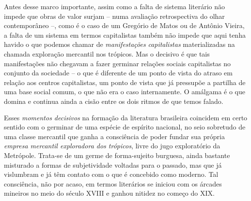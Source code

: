 Antes desse marco importante, assim como a falta de sistema literário
não impede que obras de valor surjam -- numa avaliação retrospectiva do
olhar contemporâneo --, como é o caso de um Gregório de Matos ou de
Antônio Vieira, a falta de um sistema em termos capitalistas também não
impede que aqui tenha havido o que podemos chamar de
\emph{manifestações} \emph{capitalistas} materializadas na chamada
exploração mercantil nos trópicos. Mas o decisivo é que tais
manifestações não chegavam a fazer germinar relações sociais
capitalistas no conjunto da sociedade -- o que é diferente de um ponto
de vista do atraso em relação aos centros capitalistas, um ponto de
vista que já pressupõe a partilha de uma base social comum, o que não
era o caso internamente. O amálgama é o que domina e continua ainda a
cisão entre os dois ritmos de que temos falado.

Esses \emph{momentos decisivos} na formação da literatura brasileira
coincidem em certo sentido com o germinar de uma espécie de espírito
nacional, no seio sobretudo de uma classe mercantil que ganha a
consciência de poder fundar sua própria \emph{empresa mercantil
exploradora dos trópicos}, livre do jugo exploratório da Metrópole.
Trata-se de um germe de forma-sujeito burguesa, ainda bastante misturado
a formas de subjetividade voltadas para o passado, mas que já vislumbram
e já têm contato com o que é concebido como moderno. Tal consciência,
não por acaso, em termos literários se iniciou com os árcades mineiros
no meio do século XVIII e ganhou nitidez no começo do XIX.

